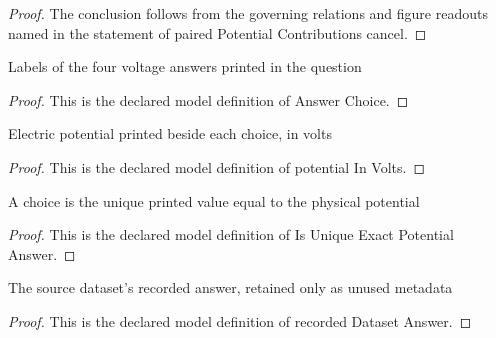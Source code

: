 \begin{proof}
  The conclusion follows from the governing relations and figure readouts named in the statement of paired Potential Contributions cancel.
\end{proof}
\begin{definition}
  \label{def:physics:phyx-mini-0863:phyxminiproblems-problemphyxmini0863-answerchoice}
  Labels of the four voltage answers printed in the question
\end{definition}
\begin{proof}
  This is the declared model definition of Answer Choice.
\end{proof}
\begin{definition}
  \label{def:physics:phyx-mini-0863:phyxminiproblems-problemphyxmini0863-answerchoice-potentialinvolts}
  Electric potential printed beside each choice, in volts
\end{definition}
\begin{proof}
  This is the declared model definition of potential In Volts.
\end{proof}
\begin{definition}
  \label{def:physics:phyx-mini-0863:phyxminiproblems-problemphyxmini0863-isuniqueexactpotentialanswer}
  A choice is the unique printed value equal to the physical potential
\end{definition}
\begin{proof}
  This is the declared model definition of Is Unique Exact Potential Answer.
\end{proof}
\begin{definition}
  \label{def:physics:phyx-mini-0863:phyxminiproblems-problemphyxmini0863-recordeddatasetanswer}
  The source dataset's recorded answer, retained only as unused metadata
\end{definition}
\begin{proof}
  This is the declared model definition of recorded Dataset Answer.
\end{proof}
